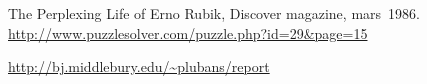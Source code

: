 \documentclass{article}
\begin{document}
\begin{thebibliography}{}

\bibitem{} The Perplexing Life of Erno Rubik, Discover magazine,
  mars~1986.
  \url{http://www.puzzlesolver.com/puzzle.php?id=29&page=15}


\bibitem{} \url{http://bj.middlebury.edu/~plubans/report}
\end{thebibliography}
\end{document}
